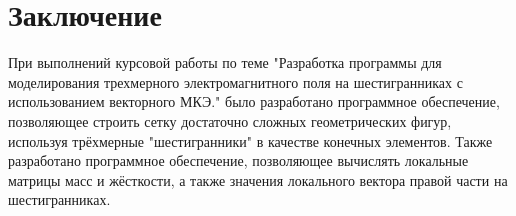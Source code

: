 \chapter*{Заключение}


При выполнений курсовой работы по теме  "Разработка программы для моделирования трехмерного электромагнитного поля на шестигранниках с использованием векторного МКЭ." было разработано программное обеспечение, позволяющее строить сетку достаточно сложных геометрических фигур, используя трёхмерные "шестигранники" в качестве конечных элементов. Также разработано программное обеспечение, позволяющее вычислять локальные матрицы масс и жёсткости, а также значения локального вектора правой части на шестигранниках. 
